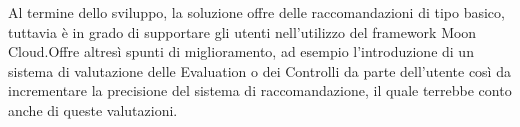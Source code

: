 \documentclass[10pt,a4paper]{article}
\begin{document}
%
Al termine dello sviluppo, la soluzione offre delle raccomandazioni di tipo basico, tuttavia è in grado di supportare gli utenti nell'utilizzo del framework 
Moon Cloud.Offre altresì spunti di miglioramento, ad esempio l'introduzione di un sistema di valutazione delle Evaluation o dei Controlli da parte dell'utente 
così da incrementare la precisione del sistema di raccomandazione, il quale terrebbe conto anche di queste valutazioni.
\end{document}
